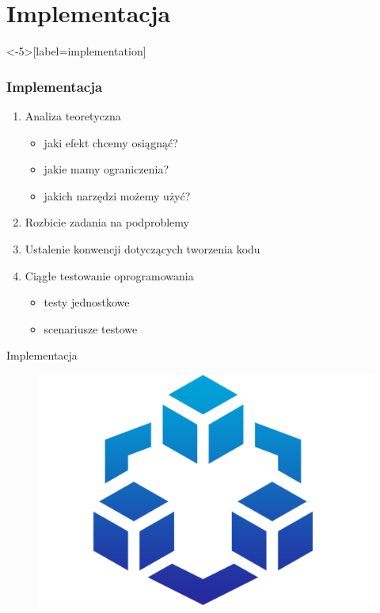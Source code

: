 \section{Implementacja}

\begin{frame}<-5>[label=implementation]
    \frametitle{Implementacja}
    \begin{enumerate}
        \item<1-> Analiza teoretyczna
            \begin{itemize}
                \item<2-> jaki efekt chcemy osiągnąć?
                \item<3-> jakie mamy ograniczenia?
                \item<4-> jakich narzędzi możemy użyć?
            \end{itemize}
        \item<5-> Rozbicie zadania na podproblemy
        \item<6-> Ustalenie konwencji dotyczących tworzenia kodu
        \item<7-> Ciągłe testowanie oprogramowania
            \begin{itemize}
                \item<8-> testy jednostkowe
                \item<9-> scenariusze testowe
            \end{itemize}
    \end{enumerate} 
\end{frame}

\begin{frame}{Implementacja}
    \begin{figure}
        \centering
        \includegraphics[scale=0.5]{img/modularity.png}
    \end{figure}
\end{frame}

